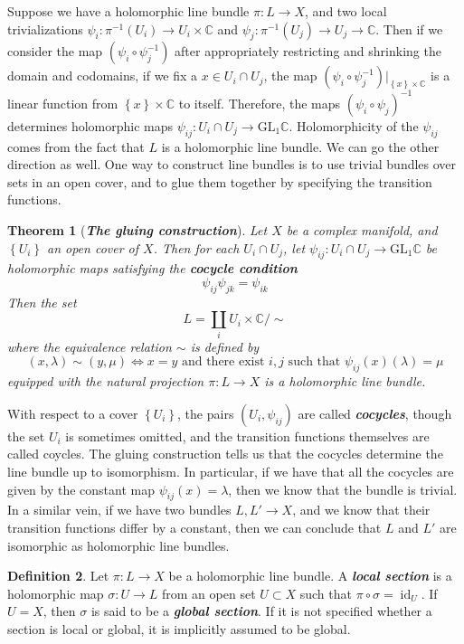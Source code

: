 \documentclass[psamsfonts, 12pt]{amsart}
\newtheorem{thm}{Theorem}[section]
\theoremstyle{definition}
\newtheorem{defn}[thm]{Definition}
\theoremstyle{remark}
\newcommand{\ib}[1]{\textbf{\textit{#1}}}
\newcommand{\C}{\mathbb{C}}
\newcommand{\GL}{\mathrm{GL}}
\newcommand{\inv}{^{-1}}
\newcommand{\set}[1]{\left\lbrace #1 \right\rbrace}
\DeclareMathOperator{\id}{id}
\begin{document}
Suppose we have a holomorphic line bundle $\pi : L \to X$, and two local trivializations
$\psi_i : \pi\inv(U_i) \to U_i \times \C$ and $\psi_j : \pi\inv(U_j) \to U_j \to \C$.
Then if we consider the map $(\psi_i \circ \psi_j\inv)$ after appropriately restricting
and shrinking the domain and codomains, if we fix a $x \in U_i \cap U_j$,
the map $(\psi_i \circ \psi_j\inv)\vert_{\set{x} \times \C}$ is a linear function
from $\set{x} \times \C$ to itself. Therefore, the maps $(\psi_i \circ \psi_j)\inv$
determines holomorphic maps $\psi_{ij} : U_i \cap U_j \to \GL_1\C$. Holomorphicity of the
$\psi_{ij}$ comes from the fact that $L$ is a holomorphic line bundle. We can go the
other direction as well. One way to construct line bundles is to use trivial bundles over
sets in an open cover, and to glue them together by specifying the transition functions.
%
\begin{thm}[\ib{The gluing construction}]
Let $X$ be a complex manifold, and $\set{U_i}$ an open cover of $X$. Then
for each $U_i  \cap U_j$, let $\psi_{ij} : U_i\cap U_j \to \GL_1\C$ be holomorphic
maps satisfying the \ib{cocycle condition}
\[
\psi_{ij}\psi_{jk} = \psi_{ik}
\]
Then the set
\[
L = \coprod_{i} U_i \times \C/\sim
\]
where the equivalence relation $\sim$ is defined by
\[
(x,\lambda) \sim (y,\mu) \iff x=y \text{ and there exist } i,j \text{ such that }
\psi_{ij}(x)(\lambda) = \mu
\]
equipped with the natural projection $\pi : L \to X$ is a holomorphic line bundle.
\end{thm}
%
With respect to a cover $\set{U_i}$, the pairs $(U_i, \psi_{ij})$ are called
\ib{cocycles}, though the set $U_i$ is sometimes omitted, and the transition
functions themselves are called coycles. The gluing construction tells us
that the cocycles determine the line bundle up to isomorphism. In
particular, if we have that all the cocycles are given by the constant map
$\psi_{ij}(x) = \lambda$, then we know that the bundle is trivial. In a similar
vein, if we have two bundles $L,L' \to X$, and we know that their transition
functions differ by a constant, then we can conclude that $L$ and $L'$ are
isomorphic as holomorphic line bundles.
%
\begin{defn}
Let $\pi : L \to X$ be a holomorphic line bundle. A \ib{local section} is
a holomorphic map $\sigma : U \to L$  from an open set $U \subset X$ such that
$\pi \circ \sigma = \id_U$. If $U = X$, then $\sigma$ is said to be a
\ib{global section}. If it is not specified whether a section is local
or global, it is implicitly assumed to be global.
\end{defn}
\end{document}
